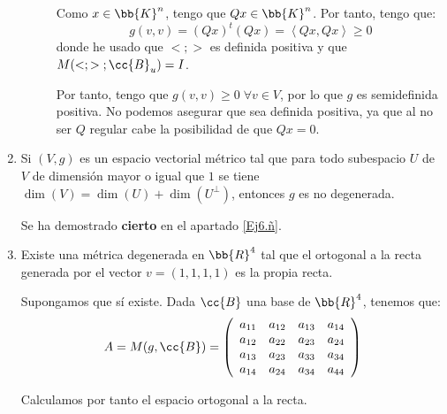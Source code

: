 \begin{ejercicio}
\begin{enumerate}
\begin{description}
            Como $x\in \bb{K}^n$, tengo que $Qx\in \bb{K}^n$. Por tanto, tengo que:
            \begin{equation*}
                g(v,v) = (Qx)^t(Qx) = \left<Qx,Qx\right> \geq 0
            \end{equation*}
            donde he usado que $<;>$ es definida positiva y que $M(<;>\;;\cc{B}_u)=I$.

            Por tanto, tengo que $g(v,v)\geq 0\;\forall v\in V$, por lo que $g$ es semidefinida positiva. No podemos asegurar que sea definida positiva, ya que al no ser $Q$ regular cabe la posibilidad de que $Qx=0$.
            
            
        \end{description}

        \item Si $(V,g)$ es un espacio vectorial métrico tal que para todo subespacio $U$ de $V$ de dimensión mayor o igual que $1$ se tiene $\dim(V) = \dim(U) + \dim(U^\perp)$, entonces $g$ es no degenerada.

        Se ha demostrado \textbf{cierto} en el apartado \ref{Ej6.ñ}.

        \item Existe una métrica degenerada en $\bb{R}^4$ tal que el ortogonal a la recta generada por el vector $v = (1,1,1,1)$ es la propia recta.

        Supongamos que sí existe. Dada $\cc{B}$ una base de $\bb{R}^4$, tenemos que:
        \begin{equation*}
            A = M(g, \cc{B}) = \left( \begin{array}{cccc}
                 a_{11} & a_{12} & a_{13} & a_{14} \\
                 a_{12} & a_{22} & a_{23} & a_{24} \\
                 a_{13} & a_{23} & a_{33} & a_{34} \\
                 a_{14} & a_{24} & a_{34} & a_{44}
            \end{array}\right)
        \end{equation*}

        Calculamos por tanto el espacio ortogonal a la recta.
        

\end{enumerate}
\end{ejercicio}

